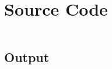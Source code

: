 \documentclass[12pt]{article}
\title{}
\date{}
\author{}
\begin{document}
	\vspace{-4cm}
	\section*{Source Code}
	\begin{verbatim}
	\end{verbatim}
	\newpage

\begin{multicols}{2}
	\section*{Output}
	\begin{verbatim}
	\end{verbatim}
\end{multicols}
\end{document}
